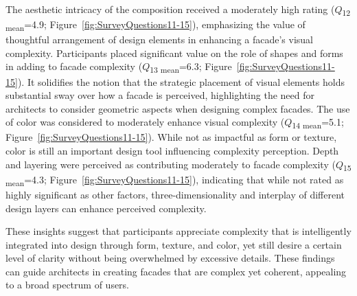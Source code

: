 The aesthetic intricacy of the composition received a moderately high rating (\(Q\)\textsubscript{\small{12 mean}}=4.9; Figure~\ref{fig:SurveyQuestions11-15}), emphasizing the value of thoughtful arrangement of design elements in enhancing a facade's visual complexity.
Participants placed significant value on the role of shapes and forms in adding to facade complexity (\(Q\)\textsubscript{\small{13 mean}}=6.3; Figure~\ref{fig:SurveyQuestions11-15}).
It solidifies the notion that the strategic placement of visual elements holds substantial sway over how a facade is perceived, highlighting the need for architects to consider geometric aspects when designing complex facades.
The use of color was considered to moderately enhance visual complexity (\(Q\)\textsubscript{\small{14 mean}}=5.1; Figure~\ref{fig:SurveyQuestions11-15}). While not as impactful as form or texture, color is still an important design tool influencing complexity perception.
Depth and layering were perceived as contributing moderately to facade complexity (\(Q\)\textsubscript{\small{15 mean}}=4.3; Figure~\ref{fig:SurveyQuestions11-15}), indicating that while not rated as highly significant as other factors, three-dimensionality and interplay of different design layers can enhance perceived complexity.

These insights suggest that participants appreciate complexity that is intelligently integrated into design through form, texture, and color, yet still desire a certain level of clarity without being overwhelmed by excessive details.
These findings can guide architects in creating facades that are complex yet coherent, appealing to a broad spectrum of users.

